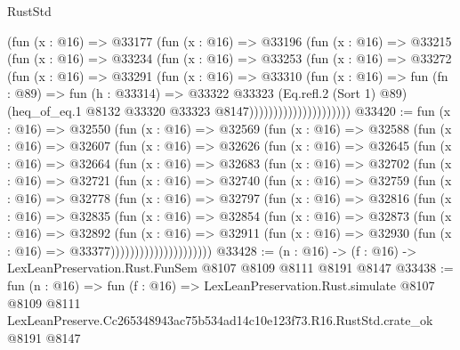 \begin{lexlean}{RustStd}
\begin{coremodule}
                          (fun (x : @16) =>
                          @33177
                            (fun (x : @16) =>
                            @33196
                              (fun (x : @16) =>
                              @33215
                                (fun (x : @16) =>
                                @33234
                                  (fun (x : @16) =>
                                  @33253
                                    (fun (x : @16) =>
                                    @33272
                                      (fun (x : @16) =>
                                      @33291
                                        (fun (x : @16) =>
                                        @33310
                                          (fun (x : @16) =>
                                          fun (fn : @89) =>
                                          fun (h : @33314) =>
                                          @33322
                                            @33323
                                            (Eq.refl.{2} (Sort 1) @89)
                                            (heq_of_eq.{1}
                                              @8132
                                              @33320
                                              @33323
                                              @8147)))))))))))))))))))))
@33420 := fun (x : @16) =>
  @32550
    (fun (x : @16) =>
    @32569
      (fun (x : @16) =>
      @32588
        (fun (x : @16) =>
        @32607
          (fun (x : @16) =>
          @32626
            (fun (x : @16) =>
            @32645
              (fun (x : @16) =>
              @32664
                (fun (x : @16) =>
                @32683
                  (fun (x : @16) =>
                  @32702
                    (fun (x : @16) =>
                    @32721
                      (fun (x : @16) =>
                      @32740
                        (fun (x : @16) =>
                        @32759
                          (fun (x : @16) =>
                          @32778
                            (fun (x : @16) =>
                            @32797
                              (fun (x : @16) =>
                              @32816
                                (fun (x : @16) =>
                                @32835
                                  (fun (x : @16) =>
                                  @32854
                                    (fun (x : @16) =>
                                    @32873
                                      (fun (x : @16) =>
                                      @32892
                                        (fun (x : @16) =>
                                        @32911
                                          (fun (x : @16) =>
                                          @32930 (fun (x : @16) => @33377)))))))))))))))))))))
@33428 := (n : @16) -> (f : @16) -> LexLeanPreservation.Rust.FunSem @8107 @8109 @8111 @8191 @8147
@33438 := fun (n : @16) =>
  fun (f : @16) =>
  LexLeanPreservation.Rust.simulate
    @8107
    @8109
    @8111
    LexLeanPreserve.Cc265348943ac75b534ad14c10e123f73.R16.RustStd.crate_ok
    @8191
    @8147
\end{coremodule}
\end{lexlean}
